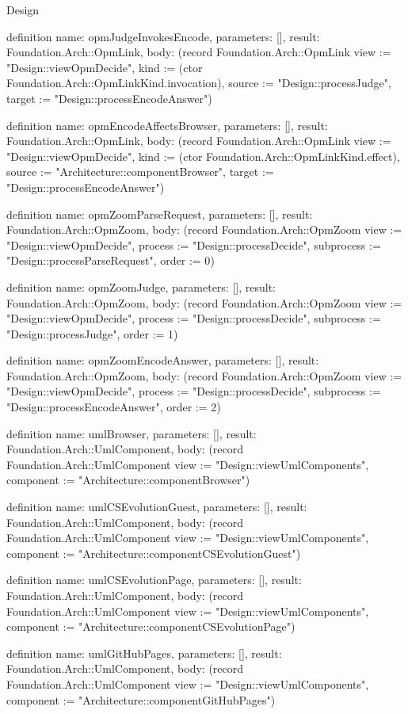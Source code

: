 \begin{lexlean}{Design}
\begin{semanticmodule}
definition{
  name: opmJudgeInvokesEncode,
  parameters: [],
  result: Foundation.Arch::OpmLink,
  body: (record Foundation.Arch::OpmLink {view := "Design::viewOpmDecide", kind := (ctor Foundation.Arch::OpmLinkKind.invocation), source := "Design::processJudge", target := "Design::processEncodeAnswer"})
}

definition{
  name: opmEncodeAffectsBrowser,
  parameters: [],
  result: Foundation.Arch::OpmLink,
  body: (record Foundation.Arch::OpmLink {view := "Design::viewOpmDecide", kind := (ctor Foundation.Arch::OpmLinkKind.effect), source := "Architecture::componentBrowser", target := "Design::processEncodeAnswer"})
}

definition{
  name: opmZoomParseRequest,
  parameters: [],
  result: Foundation.Arch::OpmZoom,
  body: (record Foundation.Arch::OpmZoom {view := "Design::viewOpmDecide", process := "Design::processDecide", subprocess := "Design::processParseRequest", order := 0})
}

definition{
  name: opmZoomJudge,
  parameters: [],
  result: Foundation.Arch::OpmZoom,
  body: (record Foundation.Arch::OpmZoom {view := "Design::viewOpmDecide", process := "Design::processDecide", subprocess := "Design::processJudge", order := 1})
}

definition{
  name: opmZoomEncodeAnswer,
  parameters: [],
  result: Foundation.Arch::OpmZoom,
  body: (record Foundation.Arch::OpmZoom {view := "Design::viewOpmDecide", process := "Design::processDecide", subprocess := "Design::processEncodeAnswer", order := 2})
}

definition{
  name: umlBrowser,
  parameters: [],
  result: Foundation.Arch::UmlComponent,
  body: (record Foundation.Arch::UmlComponent {view := "Design::viewUmlComponents", component := "Architecture::componentBrowser"})
}

definition{
  name: umlCSEvolutionGuest,
  parameters: [],
  result: Foundation.Arch::UmlComponent,
  body: (record Foundation.Arch::UmlComponent {view := "Design::viewUmlComponents", component := "Architecture::componentCSEvolutionGuest"})
}

definition{
  name: umlCSEvolutionPage,
  parameters: [],
  result: Foundation.Arch::UmlComponent,
  body: (record Foundation.Arch::UmlComponent {view := "Design::viewUmlComponents", component := "Architecture::componentCSEvolutionPage"})
}

definition{
  name: umlGitHubPages,
  parameters: [],
  result: Foundation.Arch::UmlComponent,
  body: (record Foundation.Arch::UmlComponent {view := "Design::viewUmlComponents", component := "Architecture::componentGitHubPages"})
}


\end{semanticmodule}
\end{lexlean}

